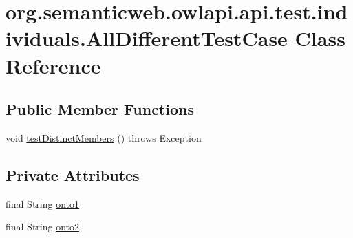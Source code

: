 \hypertarget{classorg_1_1semanticweb_1_1owlapi_1_1api_1_1test_1_1individuals_1_1_all_different_test_case}{\section{org.\-semanticweb.\-owlapi.\-api.\-test.\-individuals.\-All\-Different\-Test\-Case Class Reference}
\label{classorg_1_1semanticweb_1_1owlapi_1_1api_1_1test_1_1individuals_1_1_all_different_test_case}
}
\subsection*{Public Member Functions}
\begin{DoxyCompactItemize}
\item 
void \hyperlink{classorg_1_1semanticweb_1_1owlapi_1_1api_1_1test_1_1individuals_1_1_all_different_test_case_a5ad487850d10a6d4c18f2833c4ae5ce1}{test\-Distinct\-Members} ()  throws Exception 
\end{DoxyCompactItemize}
\subsection*{Private Attributes}
\begin{DoxyCompactItemize}
\item 
final String \hyperlink{classorg_1_1semanticweb_1_1owlapi_1_1api_1_1test_1_1individuals_1_1_all_different_test_case_a99f4811a4555058abbb5b5275e34a25c}{onto1}
\item 
final String \hyperlink{classorg_1_1semanticweb_1_1owlapi_1_1api_1_1test_1_1individuals_1_1_all_different_test_case_a59e05351435a2f577dd8713dd1c356ab}{onto2}
\end{DoxyCompactItemize}


